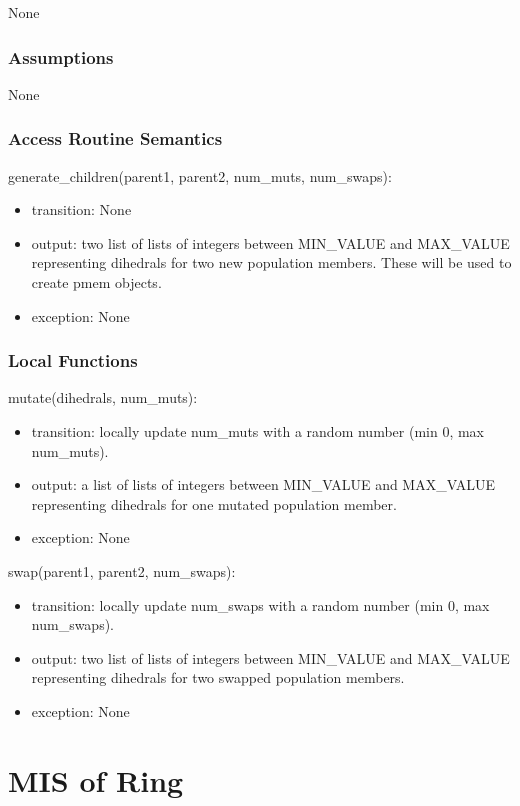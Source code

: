 \documentclass[12pt, titlepage]{article}
\begin{document}
None

\subsubsection{Assumptions}

None 

\subsubsection{Access Routine Semantics}

\noindent generate\_children(parent1, parent2, num\_muts, num\_swaps):
\begin{itemize}
	\item transition: None
	\item output: two list of lists of integers between MIN\_VALUE and 
	MAX\_VALUE representing dihedrals for two new population members. These 
	will be used to create pmem objects.
	\item exception: None
\end{itemize}

\subsubsection{Local Functions}

\noindent mutate(dihedrals, num\_muts):
\begin{itemize}
	\item transition: locally update num\_muts with a random number (min 0, max 
	num\_muts).
	\item output: a list of lists of integers between MIN\_VALUE and 
	MAX\_VALUE representing dihedrals for one mutated population member.
	\item exception: None
\end{itemize}

\noindent swap(parent1, parent2, num\_swaps):
\begin{itemize}
	\item transition: locally update num\_swaps with a random number (min 0, 
	max num\_swaps).
	\item output: two list of lists of integers between MIN\_VALUE and 
	MAX\_VALUE representing dihedrals for two swapped population members.
	\item exception: None
\end{itemize}

\section{MIS of Ring} \label{section-ring}
\end{document}
